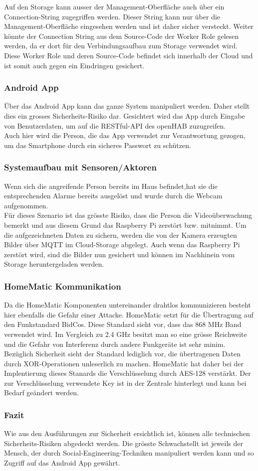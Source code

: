 Auf den Storage kann ausser der Management-Oberfläche auch über ein Connection-String zugegriffen werden. Dieser String kann nur über die Management-Oberfläche eingesehen werden und ist daher sicher versteckt. Weiter könnte der Connection String aus dem Source-Code der Worker Role gelesen werden, da er dort für den Verbindungsaufbau zum Storage verwendet wird. Diese Worker Role und deren Source-Code befindet sich innerhalb der Cloud und ist somit auch gegen ein Eindringen gesichert. \\

\subsubsection{Android App}
Über das Android App kann das ganze System manipuliert werden. Daher stellt dies ein grosses Sicherheits-Risiko dar. Gesichtert wird das App durch Eingabe von Benutzerdaten, um auf die RESTful-API des openHAB zuzugreifen. \\
Auch hier wird die Person, die das App verwendet zur Verantwortung gezogen, um das Smartphone durch ein sicheres Passwort zu schützen.

\subsubsection{Systemaufbau mit Sensoren/Aktoren}
Wenn sich die angreifende Person bereits im Haus befindet,hat sie die entsprechenden Alarme bereits ausgelöst und wurde durch die Webcam aufgenommen. \\
Für dieses Szenario ist das grösste Risiko, dass die Person die Videoüberwachung bemerkt und aus diesem Grund das Raspberry Pi zerstört bzw. mitnimmt. Um die aufgezeichneten Daten zu sichern, werden die von der Kamera erzeugten Bilder über MQTT im Cloud-Storage abgelegt. Auch wenn das Raspberry Pi zerstört wird, sind die Bilder nun gesichert und können im Nachhinein vom Storage heruntergeladen werden.

\subsubsection{HomeMatic Kommunikation}
Da die HomeMatic Komponenten untereinander drahtlos kommunizieren besteht hier ebenfalls die Gefahr einer Attacke. HomeMatic setzt für die Übertragung auf den Funkstandard BidCos. Diese Standard sieht vor, dass das 868 MHz Band verwendet wird. Im Vergleich zu 2.4 GHz besitzt man so eine grösse Reichweite und die Gefahr von Interferenz durch andere Funkgeräte ist sehr minim.\\
Bezüglich Sicherheit sieht der Standard lediglich vor, die übertragenen Daten durch XOR-Operationen unleserlich zu machen. HomeMatic hat daher bei der Implentierung dieses Stanards die Verschlüsselung durch AES-128 verstärkt. Der zur Verschlüsselung verwendete Key ist in der Zentrale hinterlegt und kann bei Bedarf geändert werden.


\subsubsection{Fazit}
Wie aus den Ausführungen zur Sicherheit ersichtlich ist, können alle technischen Sicherheits-Risiken abgedeckt werden. Die grösste Schwachstellt ist jeweils der Mensch, der durch Social-Engineering-Techniken manipuliert werden kann und so Zugriff auf das Android App gewährt.
